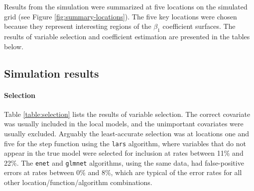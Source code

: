 \documentclass[authoryear, review, 11pt]{elsarticle}
\begin{document}
	
	Results from the simulation were summarized at five locations on the simulated grid (see Figure \ref{fig:summary-locations}). The five key locations were chosen because they represent interesting regions of the $\beta_1$ coefficient surfaces. The results of variable selection and coefficient estimation are presented in the tables below.
	
	
		
	\subsection{Simulation results}
	
	\paragraph{Selection} Table \ref{table:selection} lists the results of variable selection. The correct covariate was usually included in the local models, and the unimportant covariates were usually excluded. Arguably the least-accurate selection was at locations one and five for the step function using the {\tt lars} algorithm, where variables that do not appear in the true model were selected for inclusion at rates between 11\% and 22\%. The {\tt enet} and {\tt glmnet} algorithms, using the same data, had false-positive errors at rates between 0\% and 8\%, which are typical of the error rates for all other location/function/algorithm combinations.
	
\end{document}
